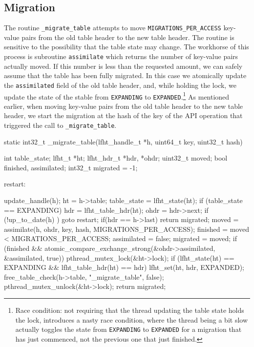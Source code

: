 \subsection{Migration}

The routine \texttt{\_migrate\_table} attempts to move
\texttt{MIGRATIONS\_PER\_ACCESS} key-value pairs from the old table
header to the new table header. The routine is sensitive to the
possibility that the table state may change.  The workhorse of this
process is subroutine \texttt{assimilate} which returns the number of
key-value pairs actually moved.  If this number is less than the
requested amount, we can safely assume that the table has been fully
migrated. In this case we atomically update the \texttt{assimilated}
field of the old table header, and, while holding the lock,
we update the state of the stable from \texttt{EXPANDING} to
\texttt{EXPANDED}.\footnote{Race condition: not requiring that the
  thread updating the table state holds the lock, introduces a nasty
  race condition, where the thread being a bit slow actually toggles
  the state from \texttt{EXPANDING} to \texttt{EXPANDED} for a
  migration that has just commenced, not the previous one that just
  finished.}  As mentioned earlier, when moving key-value pairs from
the old table header to the new table header, we start the
migration at the hash of the key of the API operation that triggered
the call to \texttt{\_migrate\_table}.




\begin{center}
\begin{clisting}
static int32_t _migrate_table(lfht_handle_t *h, uint64_t key, uint32_t hash){
  int table_state;
  lfht_t *ht;
  lfht_hdr_t *hdr, *ohdr;
  uint32_t moved;
  bool finished, assimilated;
  int32_t migrated = -1;
  
 restart:

  update_handle(h);
  ht = h->table;
  table_state = lfht_state(ht);
  if (table_state == EXPANDING){
    hdr = lfht_table_hdr(ht);
    ohdr = hdr->next;
    if (!up\_to_date(h) ){ goto restart; }
    if(hdr == h->last){ return migrated; }
    moved = assimilate(h, ohdr, key, hash,  MIGRATIONS_PER_ACCESS);
    finished = moved < MIGRATIONS_PER_ACCESS;
    assimilated = false;
    migrated = moved;
    if (finished  &&  atomic_compare_exchange_strong(&ohdr->assimilated, &assimilated, true)){
      pthread_mutex_lock(&ht->lock);
      if (lfht_state(ht) == EXPANDING  && lfht_table_hdr(ht) == hdr){
	lfht_set(ht, hdr, EXPANDED);
        free_table_check(h->table, "_migrate_table", false);
      }
      pthread_mutex_unlock(&ht->lock);
    }
  }
  return migrated;
}
\end{clisting}
\end{center}

